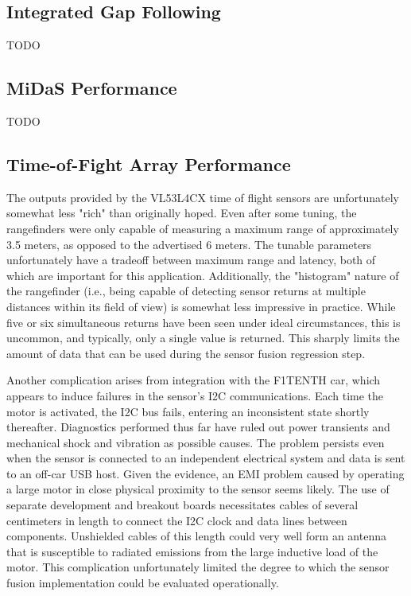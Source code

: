 \documentclass[conference]{IEEEtran}
\begin{document}
\subsection{Integrated Gap Following}
TODO

\subsection{MiDaS Performance}
TODO

\subsection{Time-of-Fight Array Performance}
The outputs provided by the VL53L4CX time of flight sensors are unfortunately
somewhat less "rich" than originally hoped. Even after some tuning, the
rangefinders were only capable of measuring a maximum range of approximately
3.5 meters, as opposed to the advertised 6 meters. The tunable parameters
unfortunately have a tradeoff between maximum range and latency, both of which
are important for this application. Additionally, the "histogram" nature of the
rangefinder (i.e., being capable of detecting sensor returns at multiple
distances within its field of view) is somewhat less impressive in practice.
While five or six simultaneous returns have been seen under ideal
circumstances, this is uncommon, and typically, only a single value is
returned. This sharply limits the amount of data that can be used during the
sensor fusion regression step.

Another complication arises from integration with the F1TENTH car, which
appears to induce failures in the sensor's I2C communications. Each time the
motor is activated, the I2C bus fails, entering an inconsistent state shortly
thereafter. Diagnostics performed thus far have ruled out power transients and
mechanical shock and vibration as possible causes. The problem persists even
when the sensor is connected to an independent electrical system and data is
sent to an off-car USB host. Given the evidence, an EMI problem caused by
operating a large motor in close physical proximity to the sensor seems likely.
The use of separate development and breakout boards necessitates cables of
several centimeters in length to connect the I2C clock and data lines between
components. Unshielded cables of this length could very well form an antenna
that is susceptible to radiated emissions from the large inductive load of the
motor. This complication unfortunately limited the degree to which the sensor
fusion implementation could be evaluated operationally.
\end{document}
